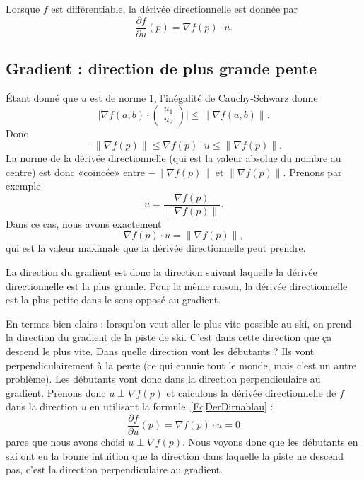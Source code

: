 Lorsque $f$ est différentiable, la dérivée directionnelle est donnée par
\begin{equation}        \label{EqDerDirnablau}
    \frac{ \partial f }{ \partial u }(p)=\nabla f(p)\cdot u.
\end{equation}

\subsection{Gradient : direction de plus grande pente}

Étant donné que $u$ est de norme $1$, l'inégalité de Cauchy-Schwarz donne
\begin{equation}
    \big| \nabla f(a,b)\cdot \begin{pmatrix}
        u_1    \\
        u_2
    \end{pmatrix}\big|\leq \| \nabla f(a,b) \|.
\end{equation}
Donc
\begin{equation}
    -\| \nabla f(p) \|\leq \nabla f(p)\cdot u\leq\| \nabla f(p) \|.
\end{equation}
La norme de la dérivée directionnelle (qui est la valeur absolue du nombre au centre) est donc «coincée» entre $-\| \nabla f(p) \|$ et $\| \nabla f(p) \|$. Prenons par exemple
\begin{equation}
    u=\frac{ \nabla f(p) }{ \| \nabla f(p) \| }.
\end{equation}
Dans ce cas, nous avons exactement
\begin{equation}
    \nabla f(p)\cdot u=\| \nabla f(p) \|,
\end{equation}
qui est la valeur maximale que la dérivée directionnelle peut prendre.

La direction du gradient est donc la direction suivant laquelle la dérivée directionnelle est la plus grande. Pour la même raison, la dérivée directionnelle est la plus petite dans le sens opposé au gradient.

En termes bien clairs : lorsqu'on veut aller le plus vite possible au ski, on prend la direction du gradient de la piste de ski. C'est dans cette direction que ça descend le plus vite. Dans quelle direction vont les débutants ? Ils vont perpendiculairement à la pente (ce qui ennuie tout le monde, mais c'est un autre problème). Les débutants vont donc dans la direction perpendiculaire au gradient. Prenons donc $u\perp \nabla f(p)$ et calculons la dérivée directionnelle de $f$ dans la direction $u$ en utilisant la formule~\ref{EqDerDirnablau} :
\begin{equation}
    \frac{ \partial f }{ \partial u }(p)=\nabla f(p)\cdot u=0
\end{equation}
parce que nous avons choisi $u\perp \nabla f(p)$. Nous voyons donc que les débutants en ski ont eu la bonne intuition que la direction dans laquelle la piste ne descend pas, c'est la direction perpendiculaire au gradient.

